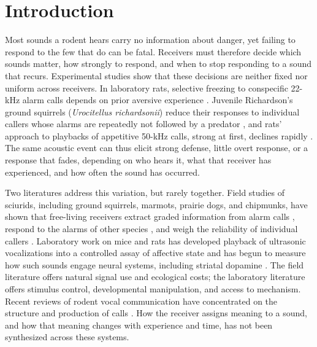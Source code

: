 \section{Introduction}
\label{sec:introduction}


Most sounds a rodent hears carry no information about danger, yet failing to respond to the few that do can be fatal. Receivers must therefore decide which sounds matter, how strongly to respond, and when to stop responding to a sound that recurs. Experimental studies show that these decisions are neither fixed nor uniform across receivers. In laboratory rats, selective freezing to conspecific 22-kHz alarm calls depends on prior aversive experience \citep{KimEtAl2010}. Juvenile Richardson's ground squirrels (\textit{Urocitellus richardsonii}) reduce their responses to individual callers whose alarms are repeatedly not followed by a predator \citep{HareAtkins2001},
and rats' approach to playbacks of appetitive 50-kHz calls, strong at first, declines rapidly \citep{WilluhnEtAl2014}. The same acoustic event can thus elicit strong defense, little overt response, or a response that fades, depending on who hears it, what that receiver has experienced, and how often the sound has occurred.

Two literatures address this variation, but rarely together. Field studies of sciurids, including ground squirrels, marmots, prairie dogs, and chipmunks, have shown that free-living receivers extract graded information from alarm calls \citep{BlumsteinArmitage1997,SloanEtAl2005}, respond to the alarms of other species \citep{Shriner1998}, and weigh the reliability of individual callers \citep{BlumsteinEtAl2004}. Laboratory work on mice and rats has developed playback of ultrasonic vocalizations into a controlled assay of affective state \citep{BonautoEtAl2023} and has begun to measure how such sounds engage neural systems, including striatal dopamine \citep{WilluhnEtAl2014}. The field literature offers natural signal use and ecological costs; the laboratory literature offers stimulus control, developmental manipulation, and access to mechanism. Recent reviews of rodent vocal communication have concentrated on the structure and production of calls \citep{SolajaGustison2026}. How the receiver assigns meaning to a sound, and how that meaning changes with experience and time, has not been synthesized across these systems.

